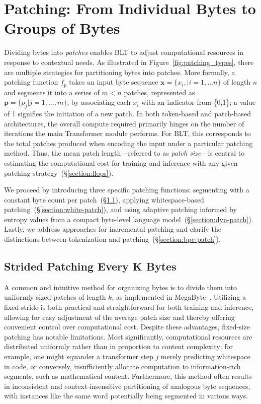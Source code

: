 \section{Patching: From Individual Bytes to Groups of Bytes}
\label{section:patching}

Dividing bytes into \textit{patches} enables {\textsc BLT} to adjust computational resources in response to contextual needs. As illustrated in Figure~\ref{fig:patching_types}, there are multiple strategies for partitioning bytes into patches. More formally, a patching function $f_p$ takes an input byte sequence $\pmb{x}=\{x_i,|i=1,\ldots n\}$ of length $n$ and segments it into a series of $m < n$ patches, represented as $\pmb{p}=\{p_j|j=1,\ldots,m\}$, by associating each $x_i$ with an indicator from \{0,1\}; a value of 1 signifies the initiation of a new patch. In both token-based and patch-based architectures, the overall compute required primarily hinges on the number of iterations the main Transformer module performs. For {\textsc BLT}, this corresponds to the total patches produced when encoding the input under a particular patching method. Thus, the mean patch length—referred to as \textit{patch size}—is central to estimating the computational cost for training and inference with any given patching strategy~(\S\ref{section:flops}).

We proceed by introducing three specific patching functions: segmenting with a constant byte count per patch~(\S\ref{section:static-patch}), applying whitespace-based patching~(\S\ref{section:white-patch}), and using adaptive patching informed by entropy values from a compact byte-level language model~(\S\ref{section:dyn-patch}). Lastly, we address approaches for incremental patching and clarify the distinctions between tokenization and patching~(\S\ref{section:bpe-patch}).

\subsection{Strided Patching Every K Bytes}
\label{section:static-patch}

A common and intuitive method for organizing bytes is to divide them into uniformly sized patches of length $k$, as implemented in MegaByte~\citep{yu2023megabyte}. Utilizing a fixed stride is both practical and straightforward for both training and inference, allowing for easy adjustment of the average patch size and thereby offering convenient control over computational cost. Despite these advantages, fixed-size patching has notable limitations. Most significantly, computational resources are distributed uniformly rather than in proportion to content complexity: for example, one might squander a transformer step $j$ merely predicting whitespace in code, or conversely, insufficiently allocate computation to information-rich segments, such as mathematical content. Furthermore, this method often results in inconsistent and context-insensitive partitioning of analogous byte sequences, with instances like the same word potentially being segmented in various ways.

